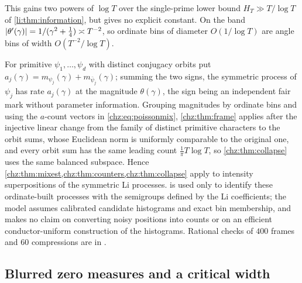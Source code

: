 This gains two powers of $\log T$ over the single-prime lower bound $H_T\gg T/\log T$ of \cref{li:thm:information}, but
gives no explicit constant. On the band $\lvert\theta'(\gamma)\rvert=1/(\gamma^2+\frac14)\asymp T^{-2}$, so ordinate bins of diameter
$O(1/\log T)$ are angle bins of width $O(T^{-2}/\log T)$.

\begin{remark}\label{chz:rem:limixture}
For primitive $\psi_1,\dots,\psi_d$ with distinct conjugacy orbits put $a_j(\gamma)=m_{\psi_j}(\gamma)+m_{\bar\psi_j}(\gamma)$; summing the
two signs, the symmetric process of $\psi_j$ has rate $a_j(\gamma)$ at the magnitude $\theta(\gamma)$, the sign being an independent
fair mark without parameter information. Grouping magnitudes by ordinate bins and using the $a$-count vectors in
\eqref{chz:eq:poissonmix}, \cref{chz:thm:frame} applies after the injective linear change from the family of distinct
primitive characters to the orbit sums, whose Euclidean norm is uniformly comparable to the original one, and every
orbit sum has the same leading count $\frac1\pi T\log T$, so \cref{chz:thm:collapse} uses the same balanced subspace.
Hence \cref{chz:thm:mixest,chz:thm:counters,chz:thm:collapse} apply to intensity superpositions of the symmetric Li
processes.  is used only to identify these ordinate-built processes with the semigroups defined by
the Li coefficients; the model assumes calibrated candidate histograms and exact bin membership, and makes no claim on
converting noisy positions into counts or on an efficient conductor-uniform construction of the histograms. Rational
checks of $400$ frames and $60$ compressions are in
.
\end{remark}

\subsection{Blurred zero measures and a critical width}\label{rec:sec:blur}

